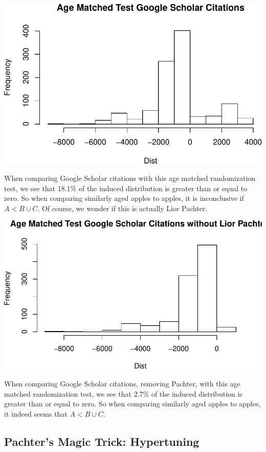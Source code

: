 \documentclass[]{article}
\begin{document}
\includegraphics{Response_files/figure-latex/unnamed-chunk-38-1.pdf}

When comparing Google Scholar citations with this age matched
randomization test, we see that 18.1\% of the induced distribution is
greater than or equal to zero. So when comparing similarly aged apples
to apples, it is inconclusive if \(A < B\cup C\). Of course, we wonder
if this is actually Lior Pachter.

\includegraphics{Response_files/figure-latex/unnamed-chunk-40-1.pdf}

When comparing Google Scholar citations, removing Pachter, with this age
matched randomization test, we see that 2.7\% of the induced
distribution is greater than or equal to zero. So when comparing
similarly aged apples to apples, it indeed seems that \(A < B\cup C\).

\hypertarget{pachters-magic-trick-hypertuning}{%
\subsection{Pachter's Magic Trick:
Hypertuning}\label{pachters-magic-trick-hypertuning}}
\end{document}
